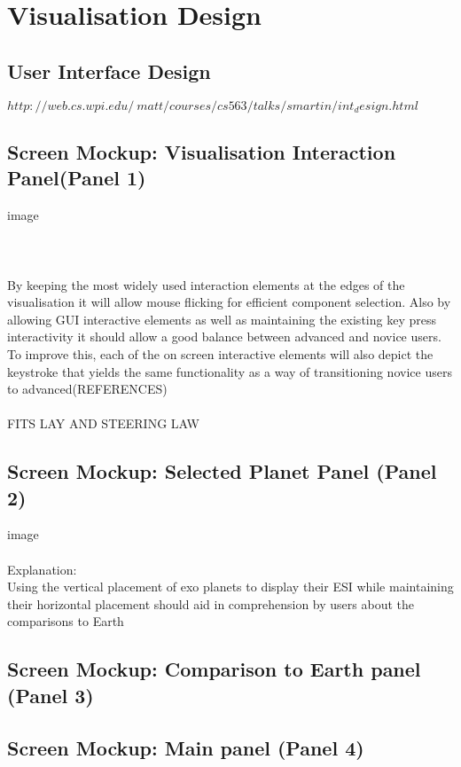 \documentclass[11pt
              , a4paper
              , twoside
              , openright
              ]{report}
\begin{document}
\chapter{Visualisation Design}
\section{User Interface Design}
$http://web.cs.wpi.edu/~matt/courses/cs563/talks/smartin/int_design.html$
\section{Screen Mockup: Visualisation Interaction Panel(Panel 1)}
image
\\\\
\\\\
By keeping the most widely used interaction elements at the edges of the visualisation it will allow mouse flicking for efficient component selection. Also by allowing GUI interactive elements as well as maintaining the existing key press interactivity it should allow a good balance between advanced and novice users. To improve this, each of the on screen interactive elements will also depict the keystroke that yields the same functionality as a way of transitioning novice users to advanced(REFERENCES)
\\\\
FITS LAY AND STEERING LAW
\section{Screen Mockup: Selected Planet Panel (Panel 2)}
image
\\\\
Explanation:
\\
Using the vertical placement of exo planets to display their ESI while maintaining their horizontal placement should aid in comprehension by users about the comparisons to Earth
\section{Screen Mockup: Comparison to Earth panel (Panel 3)}
\section{Screen Mockup: Main panel (Panel 4)}
\end{document}
